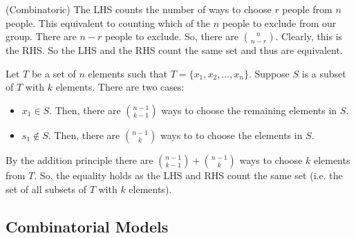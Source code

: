 \documentclass{report}
\begin{document}
\begin{subproof}{(Combinatoric)}
    The LHS counts the number of ways to choose $r$ people from $n$ people.
    This equivalent to counting which of the $n$ people to exclude from our
    group. There are $n-r$ people to exclude. So, there are $\binom{n}{n-r}$.
    Clearly, this is the RHS. So the LHS and the RHS count the same set and thus
    are equivalent.
\end{subproof}

\begin{subproof}
    Let $T$ be a set of $n$ elements such that $T=\{x_1, x_2, \dots, x_n\}$. Suppose $S$ is a subset of $T$ with
    $k$ elements. There are two cases:

    \begin{itemize}
        \item $x_1 \in S$. Then, there are $\binom{n-1}{k-1}$ ways
              to choose the remaining elements in $S$.
        \item $s_1 \not\in S$. Then, there are $\binom{n-1}{k}$ ways to
              to choose the elements in $S$.
    \end{itemize}

    By the addition principle there are $\binom{n-1}{k-1} + \binom{n-1}{k}$ ways
    to choose $k$ elements from $T$. So, the equality holds as the LHS and RHS
    count the same set (i.e. the set of all subsets of $T$ with $k$ elements).
\end{subproof}

\subsection*{Combinatorial Models}

\end{document}
